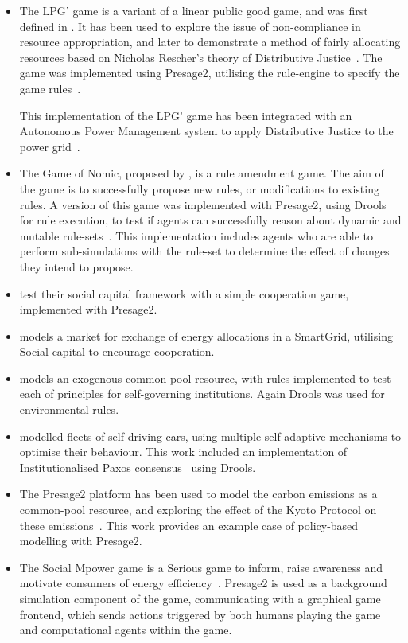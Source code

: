\begin{itemize}
\item The LPG' game is a variant of a linear public good game, and was first defined
in \citet{Pitt2012c}. It has been used to explore the issue of non-compliance
in resource appropriation, and later to demonstrate a method of fairly
allocating resources based on Nicholas Rescher's theory of Distributive
Justice~\citep{Pitt2014}. The game was implemented using Presage2, utilising
the rule-engine to specify the game rules~\citep{Macbeth2012}.

This implementation of the LPG' game has been integrated with an Autonomous
Power Management system to apply Distributive Justice to the power grid~\citep{Kohler2014}.

\item The Game of Nomic, proposed by \citet{Suber1990}, is a rule amendment game.
The aim of the game is to successfully propose new rules, or modifications to
existing rules. A version of this game was implemented with Presage2, using
Drools for rule execution, to test if agents can successfully reason about
dynamic and mutable rule-sets~\citep{Holland2013}. This implementation
includes agents who are able to perform sub-simulations with the rule-set to
determine the effect of changes they intend to propose.

\item \citet{Petruzzi2014} test their social capital framework with a simple
cooperation game, implemented with Presage2.

\item \citet{Petruzzi2013} models a market for exchange of energy allocations
in a SmartGrid, utilising Social capital to encourage cooperation.

\item \citet{Schaumeier2013} models an exogenous common-pool resource, with
rules implemented to test each of  principles
for self-governing institutions. Again Drools was used for environmental
rules.

\item \citet{Sanderson2013} modelled fleets of self-driving cars, using
multiple self-adaptive mechanisms to optimise their behaviour. This work
included an implementation of Institutionalised Paxos
consensus~\citep{Sanderson2012} using Drools.

\item The Presage2 platform has been used to model the carbon emissions as a
common-pool resource, and exploring the effect of the Kyoto Protocol on these
emissions~\citep{Macbeth2014}. This work provides an example case of 
policy-based modelling with Presage2.

\item The Social Mpower game is a Serious game to inform, raise awareness and motivate
consumers of energy efficiency~\citep{Bourazeri2014}. Presage2 is used as a
background simulation component of the game, communicating with a graphical game
frontend, which sends actions triggered by both humans playing the game and
computational agents within the game.
\end{itemize}

